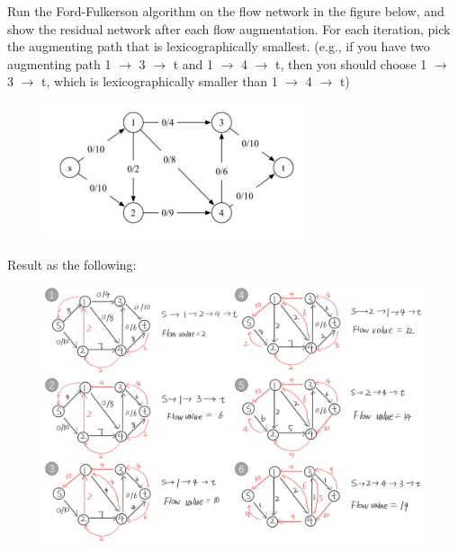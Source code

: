 \problem{}
Run the Ford-Fulkerson algorithm on the flow network in the figure below, and
show the residual network after each flow augmentation. For each iteration, pick
the augmenting path that is lexicographically smallest. (e.g., if you have two
augmenting path 1 $\rightarrow$ 3 $\rightarrow$ t and 1 $\rightarrow$ 4 $\rightarrow$ t, then you should choose 1 $\rightarrow$ 3 $\rightarrow$ t,
which is lexicographically smaller than 1 $\rightarrow$ 4 $\rightarrow$ t)


\begin{figure}[htbp]
    \centering
    \includegraphics{HW2/1.png}
    \end{figure} 

Result as the following:
\begin{figure}[htbp]
\begin{center}	
	\includegraphics[width=1\textwidth]{HW2/2.png}
\end{center}
\end{figure} 
